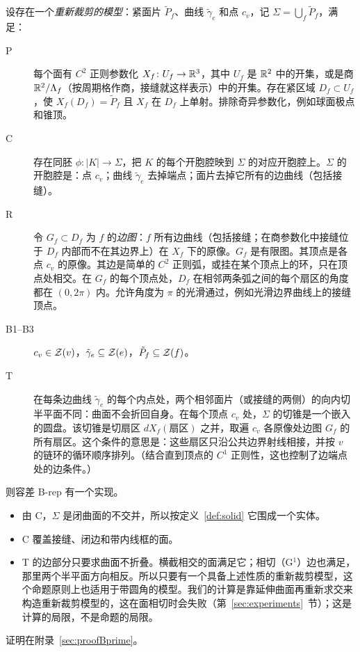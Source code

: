 \begin{proposition}[曲面重新求交]\label{prop:Bprime}
设存在一个\emph{重新裁剪的模型}：紧面片 $\tilde P_f$、曲线 $\tilde\gamma_e$ 和点 $c_v$，记 $\Sigma=\bigcup_f\tilde P_f$，满足：
\begin{description}
\item[P] 每个面有 $C^2$ 正则参数化 $X_f\colon U_f\to\mathbb{R}^3$，其中 $U_f$ 是 $\mathbb{R}^2$ 中的开集，或是商 $\mathbb{R}^2/\Lambda_f$（按周期格作商，接缝就这样表示）中的开集。存在紧区域 $D_f\subset U_f$，使 $X_f(D_f)=\tilde P_f$ 且 $X_f$ 在 $D_f$ 上单射。排除奇异参数化，例如球面极点和锥顶。
\item[C] 存在同胚 $\phi\colon|K|\to\Sigma$，把 $K$ 的每个开胞腔映到 $\Sigma$ 的对应开胞腔上。$\Sigma$ 的开胞腔是：点 $c_v$；曲线 $\tilde\gamma_e$ 去掉端点；面片去掉它所有的边曲线（包括接缝）。
\item[R] 令 $G_f\subset D_f$ 为 $f$ 的\emph{边图}：$f$ 所有边曲线（包括接缝；在商参数化中接缝位于 $D_f$ 内部而不在其边界上）在 $X_f$ 下的原像。$G_f$ 是有限图。其顶点是各点 $c_v$ 的原像。其边是简单的 $C^2$ 正则弧，或挂在某个顶点上的环，只在顶点处相交。在 $G_f$ 的每个顶点处，$D_f$ 在相邻两条弧之间的每个扇区的角度都在 $(0,2\pi)$ 内。允许角度为 $\pi$ 的光滑通过，例如光滑边界曲线上的接缝顶点。
\item[B1--B3] $c_v\in\mathcal{Z}(v)$，$\tilde\gamma_e\subseteq\mathcal{Z}(e)$，$\tilde P_f\subseteq\mathcal{Z}(f)$。
\item[T] 在每条边曲线 $\tilde\gamma_e$ 的每个内点处，两个相邻面片（或接缝的两侧）的向内切半平面不同：曲面不会折回自身。在每个顶点 $c_v$ 处，$\Sigma$ 的切锥是一个嵌入的圆盘。该切锥是切扇区 $dX_f(\text{扇区})$ 之并，取遍 $c_v$ 各原像处边图 $G_f$ 的所有扇区。这个条件的意思是：这些扇区只沿公共边界射线相接，并按 $v$ 的链环的循环顺序排列。（结合直到顶点的 $C^1$ 正则性，这也控制了边端点处的边条件。）
\end{description}
则容差 B-rep 有一个实现。
\end{proposition}

\begin{remark}
\begin{itemize}
\item 由 C，$\Sigma$ 是闭曲面的不交并，所以按定义~\ref{def:solid} 它围成一个实体。
\item C 覆盖接缝、闭边和带内线框的面。
\item T 的边部分只要求曲面不折叠。横截相交的面满足它；相切（G$^1$）边也满足，那里两个半平面方向相反。所以只要有一个具备上述性质的重新裁剪模型，这个命题原则上也适用于带圆角的模型。我们的计算是靠延伸曲面再重新求交来构造重新裁剪模型的，这在面相切时会失败（第~\ref{sec:experiments}~节）；这是计算的局限，不是命题的局限。
\end{itemize}
\end{remark}
证明在附录~\ref{sec:proofBprime}。

